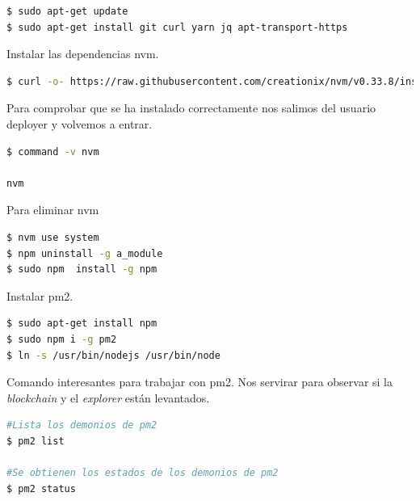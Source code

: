 \begin{lstlisting}[language=Bash,caption=Instalación \textit{blockchain}. Parte IV, label=cod:update, style=Consola]
$ sudo apt-get update
$ sudo apt-get install git curl yarn jq apt-transport-https
\end{lstlisting}

Instalar las dependencias nvm.\\

\begin{lstlisting}[language=Bash,caption=Instalación \textit{blockchain}. Parte V, label=cod:nvm, style=Consola]
$ curl -o- https://raw.githubusercontent.com/creationix/nvm/v0.33.8/install.sh | bash
\end{lstlisting}

Para comprobar que se ha instalado correctamente nos salimos del usuario deployer y volvemos a entrar.\\

\begin{lstlisting}[language=Bash,caption=Instalación \textit{blockchain}. Parte VI, label=cod:nvm, style=Consola]
$ command -v nvm

nvm
\end{lstlisting}

Para eliminar nvm
\begin{lstlisting}[language=Bash,caption=Instalación \textit{blockchain}. Parte VII, label=cod:nvm, style=Consola]
$ nvm use system
$ npm uninstall -g a_module
$ sudo npm  install -g npm
\end{lstlisting}

Instalar pm2.\\

\begin{lstlisting}[language=Bash,caption=Instalación \textit{blockchain}. Parte VIII, label=cod:npm, style=Consola]
$ sudo apt-get install npm
$ sudo npm i -g pm2
$ ln -s /usr/bin/nodejs /usr/bin/node
\end{lstlisting}

Comando interesantes para trabajar con pm2. Nos servirar para observar si la \textit{blockchain} y el \textit{explorer} están levantados.

\begin{lstlisting}[language=Bash,caption=Comandos útiles de pm2, label=cod:pm2, style=Consola]
#Lista los demonios de pm2
$ pm2 list

#Se obtienen los estados de los demonios de pm2
$ pm2 status
\end{lstlisting}

